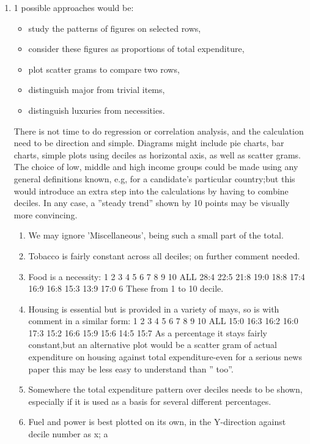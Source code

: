 \documentclass[a4paper,12pt]{article}
\begin{document}
\begin{enumerate}
    \item 1 possible approaches would be:
\begin{itemize}
\item study the patterns of figures on selected rows,
\item consider these figures as proportions of total expenditure,
\item plot scatter grams to compare two rows,
\item distinguish major from trivial items,
\item distinguish luxuries from necessities.
\end{itemize}

There is not time to do regression or correlation analysis, and the calculation need to be
direction and simple. Diagrams might include pie charts, bar charts, simple plots using deciles
as horizontal axis, as well as scatter grams.
The choice of low, middle and high income groups could be made using any general definitions
known, e.g, for a candidate’s particular country;but this would introduce an extra step into the
calculations by having to combine deciles. In any case, a ”steady trend” shown by 10 points
may be visually more convincing.
\begin{enumerate}
\item  We may ignore ’Miscellaneous’, being such a small part of the total.
\item  Tobacco is fairly constant across all deciles; on further comment needed.
\item  Food is a necessity: %
1 2 3 4 5 6 7 8 9 10 ALL
28:4 22:5 21:8 19:0 18:8 17:4 16:9 16:8 15:3 13:9 17:0
6
These %
from 1 to 10 decile.
\item  Housing is essential but is provided in a variety of mays, so is with comment in a similar
form: %
1 2 3 4 5 6 7 8 9 10 ALL
15:0 16:3 16:2 16:0 17:3 15:2 16:6 15:9 15:6 14:5 15:7
As a percentage it stays fairly constant,but an alternative plot would be a scatter gram
of actual expenditure on housing against total expenditure-even for a serious news paper
this may be less easy to understand than ”%
too”.
\item  Somewhere the total expenditure pattern over deciles needs to be shown, especially if it
is used as a basis for several different percentages.
\item  Fuel and power is best plotted on its own, in the Y-direction against decile number as x; a

\end{enumerate}
\end{enumerate}
\end{document}
